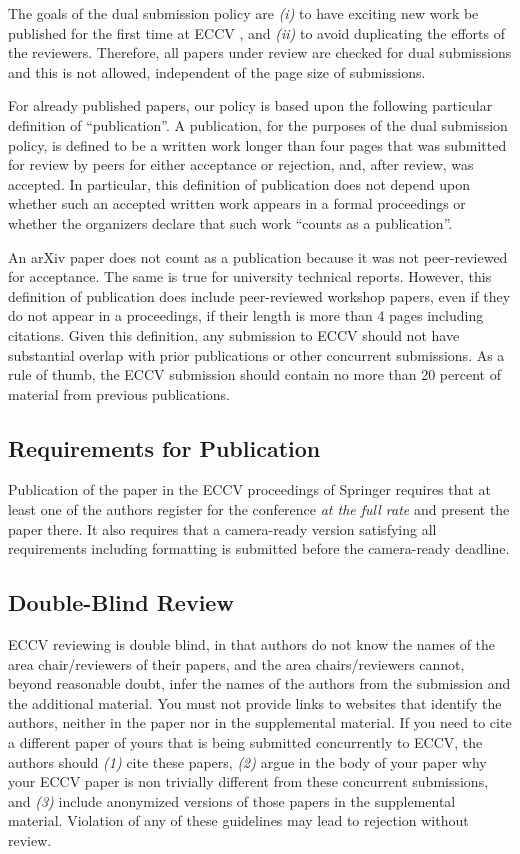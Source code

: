 \documentclass[runningheads]{llncs}
\begin{document}
The goals of the dual submission policy are \emph{(i)} to have exciting new work be published for the first time at ECCV \ECCVyear{}, and \emph{(ii)} to avoid duplicating the efforts of the reviewers.
Therefore, all papers under review are checked for dual submissions and this is not allowed, independent of the page size of submissions. 

For already published papers, our policy is based upon the following particular definition of ``publication''. 
A publication, for the purposes of the dual submission policy, is defined to be a written work longer than four pages that was submitted for review by peers for either acceptance or rejection, and, after review, was accepted. 
In particular, this definition of publication does not depend upon whether such an accepted written work appears in a formal proceedings or whether the organizers declare that such work ``counts as a publication''. 

An arXiv paper does not count as a publication because it was not peer-reviewed for acceptance. 
The same is true for university technical reports. 
However, this definition of publication does include peer-reviewed workshop papers, even if they do not appear in a proceedings, if their length is more than 4 pages including citations. 
Given this definition, any submission to ECCV \ECCVyear{} should not have substantial overlap with prior publications or other concurrent submissions. 
As a rule of thumb, the ECCV \ECCVyear{} submission should contain no more than 20 percent of material from previous publications. 


\subsection{Requirements for Publication}
Publication of the paper in the ECCV \ECCVyear{} proceedings of Springer requires that at least one of the authors register for the conference \emph{at the full rate} and present the paper there. 
It also requires that a camera-ready version satisfying all requirements including formatting is submitted before the camera-ready deadline. 


\subsection{Double-Blind Review}
\label{sec:blind}
ECCV reviewing is double blind, in that authors do not know the names of the area chair/reviewers of their papers, and the area chairs/reviewers cannot, beyond reasonable doubt, infer the names of the authors from the submission and the additional material. 
You must not provide links to websites that identify the authors, neither in the paper nor in the supplemental material.
If you need to cite a different paper of yours that is being submitted concurrently to ECCV, the authors should \emph{(1)} cite these papers, \emph{(2)} argue in the body of your paper why your ECCV paper is non trivially different from these concurrent submissions, and \emph{(3)} include anonymized versions of those papers in the supplemental material.
Violation of any of these guidelines may lead to rejection without review. 
\end{document}
